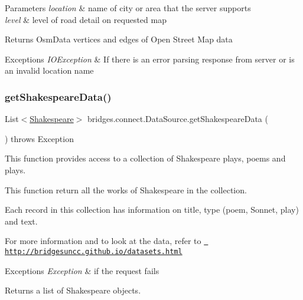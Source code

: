 \begin{DoxyParams}{Parameters}
{\em location} & name of city or area that the server supports \\
\hline
{\em level} & level of road detail on requested map \\
\hline
\end{DoxyParams}
\begin{DoxyReturn}{Returns}
Osm\+Data vertices and edges of Open Street Map data 
\end{DoxyReturn}

\begin{DoxyExceptions}{Exceptions}
{\em I\+O\+Exception} & If there is an error parsing response from server or is an invalid location name \\
\hline
\end{DoxyExceptions}
\mbox{\label{classbridges_1_1connect_1_1_data_source_af2b6e5df074d0a689e8a992b1bea6f3e}} 
\subsubsection{\texorpdfstring{getShakespeareData()}{getShakespeareData()}\hspace{0.1cm}{\footnotesize\ttfamily [1/3]}}
{\footnotesize\ttfamily List$<$\mbox{\hyperlink{classbridges_1_1data__src__dependent_1_1_shakespeare}{Shakespeare}}$>$ bridges.\+connect.\+Data\+Source.\+get\+Shakespeare\+Data (\begin{DoxyParamCaption}{ }\end{DoxyParamCaption}) throws Exception}



This function provides access to a collection of Shakespeare plays, poems and plays. 

This function return all the works of Shakespeare in the collection.

Each record in this collection has information on title, type (poem, Sonnet, play) and text.

For more information and to look at the data, refer to \href{http://bridgesuncc.github.io/datasets.html}{\texttt{ http\+://bridgesuncc.\+github.\+io/datasets.\+html}}


\begin{DoxyExceptions}{Exceptions}
{\em Exception} & if the request fails\\
\hline
\end{DoxyExceptions}
\begin{DoxyReturn}{Returns}
a list of Shakespeare objects. 
\end{DoxyReturn}
\mbox{\label{classbridges_1_1connect_1_1_data_source_a04aa757c45139e52525d4b09156abfe1}} 
